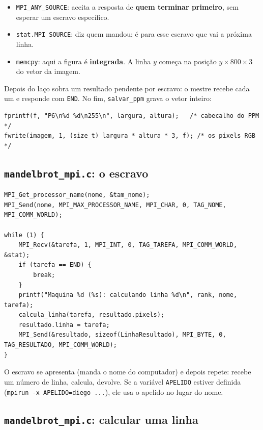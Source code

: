 \documentclass[a4paper,11pt]{article}
\begin{document}
\begin{itemize}[leftmargin=*]
  \item \texttt{MPI\_ANY\_SOURCE}: aceita a resposta de \textbf{quem terminar primeiro}, sem esperar um escravo específico.
  \item \texttt{stat.MPI\_SOURCE}: diz quem mandou; é para esse escravo que vai a próxima linha.
  \item \texttt{memcpy}: aqui a figura é \textbf{integrada}. A linha $y$ começa na posição $y \times 800 \times 3$ do vetor da imagem.
\end{itemize}

Depois do laço sobra um resultado pendente por escravo: o mestre recebe cada um e responde com \texttt{END}. No fim, \texttt{salvar\_ppm} grava o vetor inteiro:

\begin{lstlisting}
fprintf(f, "P6\n%d %d\n255\n", largura, altura);   /* cabecalho do PPM */
fwrite(imagem, 1, (size_t) largura * altura * 3, f); /* os pixels RGB    */
\end{lstlisting}

\subsection{\texttt{mandelbrot\_mpi.c}: o escravo}

\begin{lstlisting}
MPI_Get_processor_name(nome, &tam_nome);
MPI_Send(nome, MPI_MAX_PROCESSOR_NAME, MPI_CHAR, 0, TAG_NOME, MPI_COMM_WORLD);

while (1) {
    MPI_Recv(&tarefa, 1, MPI_INT, 0, TAG_TAREFA, MPI_COMM_WORLD, &stat);
    if (tarefa == END) {
        break;
    }
    printf("Maquina %d (%s): calculando linha %d\n", rank, nome, tarefa);
    calcula_linha(tarefa, resultado.pixels);
    resultado.linha = tarefa;
    MPI_Send(&resultado, sizeof(LinhaResultado), MPI_BYTE, 0, TAG_RESULTADO, MPI_COMM_WORLD);
}
\end{lstlisting}

O escravo se apresenta (manda o nome do computador) e depois repete: recebe um número de linha, calcula, devolve. Se a variável \texttt{APELIDO} estiver definida (\texttt{mpirun -x APELIDO=diego ...}), ele usa o apelido no lugar do nome.

\subsection{\texttt{mandelbrot\_mpi.c}: calcular uma linha}
\end{document}
